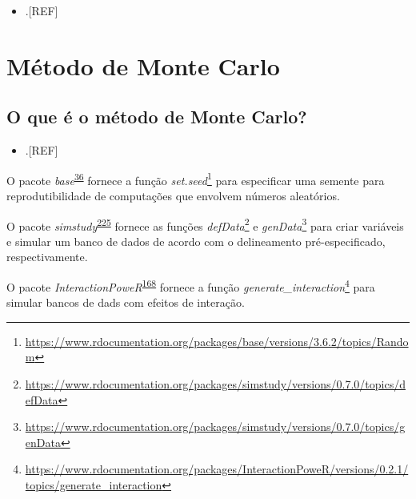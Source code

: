 \documentclass[
  a4paper,
]{book}
\providecommand{\tightlist}{%
  \setlength{\itemsep}{0pt}\setlength{\parskip}{0pt}}
\renewcommand{\href}[2]{#2\footnote{\url{#1}}}
\newenvironment{infobox}[1]
  {
  \begin{itemize}
  \renewcommand{\labelitemi}{
    \raisebox{-.7\height}[0pt][0pt]{
      {\setkeys{Gin}{width=3em,keepaspectratio}
        \texttt{[image: \#1]}}
    }
  }
  \setlength{\fboxsep}{1em}
  \begin{blackbox}
  \item
  }
  {
  \end{blackbox}
  \end{itemize}
  }
\begin{document}
\begin{itemize}
\tightlist
\item
  .{[}REF{]}
\end{itemize}

\hypertarget{monte-carlo}{%
\section{Método de Monte Carlo}\label{monte-carlo}}

\hypertarget{o-que-uxe9-o-muxe9todo-de-monte-carlo}{%
\subsection{O que é o método de Monte Carlo?}\label{o-que-uxe9-o-muxe9todo-de-monte-carlo}}

\begin{itemize}
\tightlist
\item
  .{[}REF{]}
\end{itemize}

\begin{infobox}{images/Rlogo}
O pacote \emph{base}\textsuperscript{\protect\hyperlink{ref-base-5}{36}} fornece a função \href{https://www.rdocumentation.org/packages/base/versions/3.6.2/topics/Random}{\emph{set.seed}} para especificar uma semente para reprodutibilidade de computações que envolvem números aleatórios.

\end{infobox}

\begin{infobox}{images/Rlogo}
O pacote \emph{simstudy}\textsuperscript{\protect\hyperlink{ref-simstudy}{225}} fornece as funções \href{https://www.rdocumentation.org/packages/simstudy/versions/0.7.0/topics/defData}{\emph{defData}} e \href{https://www.rdocumentation.org/packages/simstudy/versions/0.7.0/topics/genData}{\emph{genData}} para criar variáveis e simular um banco de dados de acordo com o delineamento pré-especificado, respectivamente.

\end{infobox}

\begin{infobox}{images/Rlogo}
O pacote \emph{InteractionPoweR}\textsuperscript{\protect\hyperlink{ref-InteractionPoweR}{168}} fornece a função \href{https://www.rdocumentation.org/packages/InteractionPoweR/versions/0.2.1/topics/generate_interaction}{\emph{generate\_interaction}} para simular bancos de dads com efeitos de interação.

\end{infobox}
\end{document}
